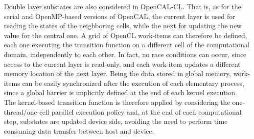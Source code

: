 Double layer substates are also considered in OpenCAL-CL. That is,
as for the serial and OpenMP-based versions of OpenCAL, the current
layer is used for reading the states of the neighboring cells, while
the next for updating the new value for the central one. A grid of
OpenCL work-items can therefore be defined, each one executing the
transition function on a different cell of the computational domain,
independently to each other. In fact, no race conditions can occur,
since access to the current layer is read-only, and each work-item
updates a different memory location of the next layer. Being the
data stored in global memory, work-items can be easily synchronized
after the execution of each elementary process, since a global
barrier is implicitly defined at the end of each kernel
execution. The kernel-based transition function is therefore applied
by considering the one-thread/one-cell parallel execution policy
and, at the end of each computational step, substates are updated
device side, avoiding the need to perform time consuming data
transfer between host and device.

